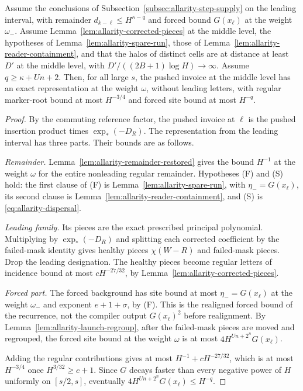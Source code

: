 \begin{proposition}
\label{prop:allarity-launch}
Assume the conclusions of Subsection~\ref{subsec:allarity-step-supply} on
the leading interval, with remainder $d_{k-\ell}\le H^{\kappa-q}$ and
forced bound $G(x_\ell)$ at the weight $\omega_-$. Assume
Lemma~\ref{lem:allarity-corrected-pieces} at the middle level, the
hypotheses of Lemma~\ref{lem:allarity-spare-run}, those of
Lemma~\ref{lem:allarity-reader-containment}, and that
the halos of distinct cells are at distance at least $D'$ at the middle
level, with $D'/((2B+1)\log H)\to\infty$. Assume $q\ge\kappa+Un+2$.
Then, for all large $s$, the pushed invoice at the middle level has an
exact representation at the weight $\omega$, without leading letters, with
regular marker-root bound at most $H^{-3/4}$ and forced site bound at most
$H^{-q}$.
\end{proposition}
\begin{proof}
By the commuting reference factor, the pushed invoice at $\ell$ is the
pushed insertion product times $\exp_*(-D_R)$. The representation from
the leading interval has three parts. Their bounds are as follows.

\emph{Remainder.} Lemma~\ref{lem:allarity-remainder-restored} gives the
bound $H^{-1}$ at the weight $\omega$ for the entire nonleading regular
remainder. Hypotheses (F) and (S) hold: the first clause of (F) is
Lemma~\ref{lem:allarity-spare-run}, with $\eta_-=G(x_\ell)$,
its second clause is Lemma~\ref{lem:allarity-reader-containment}, and (S)
is \eqref{eq:allarity-dispersal}.

\emph{Leading family.} Its pieces are the exact prescribed principal
polynomial. Multiplying by $\exp_*(-D_R)$ and splitting each corrected
coefficient by the failed-mask identity gives healthy pieces
$\chi(W-R)$ and failed-mask pieces. Drop the leading designation. The
healthy pieces become regular letters of incidence bound at most
$cH^{-27/32}$, by Lemma~\ref{lem:allarity-corrected-pieces}.

\emph{Forced part.} The forced background has site bound at most
$\eta_-=G(x_\ell)$ at the weight $\omega_-$ and exponent $e+1+\sigma$, by
(F). This is the realigned forced bound of the recurrence, not the
compiler output $G(x_\ell)^2$ before realignment. By
Lemma~\ref{lem:allarity-launch-regroup}, after the failed-mask pieces are
moved and regrouped, the forced site bound at the weight $\omega$ is at
most $4H^{Un+2^n}G(x_\ell)$.

Adding the regular contributions gives at most $H^{-1}+cH^{-27/32}$, which
is at most $H^{-3/4}$ once $H^{3/32}\ge c+1$. Since $G$ decays faster than
every negative power of $H$ uniformly on $[s/2,s]$, eventually
$4H^{Un+2^n}G(x_\ell)\le H^{-q}$.
\end{proof}

